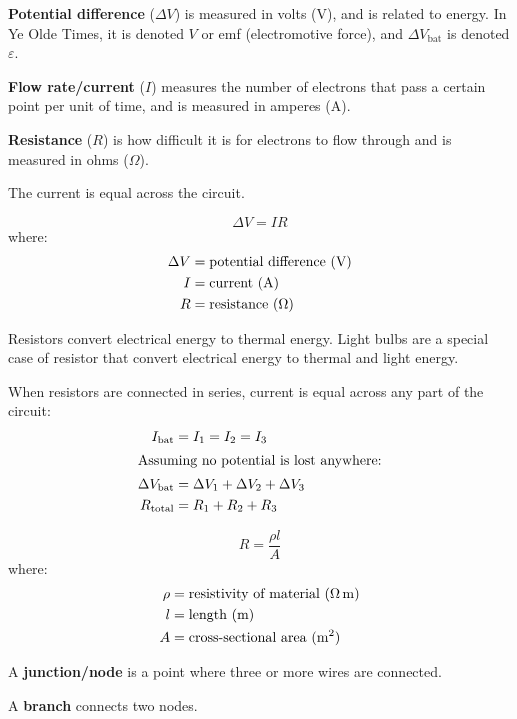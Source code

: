 \documentclass{article}
\newcommand{\definition}[1]{\begin{tcolorbox}[colback=red!5!white,colframe=red!75!black,parbox=false] #1 \end{tcolorbox}}
\newcommand{\theorem}[2]{\begin{tcolorbox}[title={#1},colback=blue!5!white,colframe=blue!75!black,parbox=false] #2 \end{tcolorbox}}
\begin{document}
\definition{
	\textbf{Potential difference} ($\Delta V$) is measured in volts (V), and is related to energy. In Ye Olde Times, it is denoted $V$ or emf (electromotive force), and $\Delta V_\text{bat}$ is denoted $\varepsilon$.

	\textbf{Flow rate/current} ($I$) measures the number of electrons that pass a certain point per unit of time, and is measured in amperes (A).

	\textbf{Resistance} ($R$) is how difficult it is for electrons to flow through and is measured in ohms ($\Omega$).
}

The current is equal across the circuit.

\theorem{Ohm's Law}{
	\begin{equation*}
	    \Delta V=IR
	\end{equation*}
	where:
	\begin{align*}
		\Delta V&=\text{potential difference (V)} \\
		I&=\text{current (A)} \\
		R&=\text{resistance (\si{\ohm})}
	\end{align*}
}

Resistors convert electrical energy to thermal energy. Light bulbs are a special case of resistor that convert electrical energy to thermal and light energy.

\theorem{Resistors in series}{
	When resistors are connected in series, current is equal across any part of the circuit:
	\begin{align*}
		I_\text{bat}&=I_1=I_2=I_3 \\
		\intertext{Assuming no potential is lost anywhere:}
		\Delta V_\text{bat}&=\Delta V_1+\Delta V_2+\Delta V_3 \\
		R_\text{total}&=R_1+R_2+R_3
	\end{align*}
}

\theorem{Resistance}{
	\begin{equation*}
	    R=\frac{\rho l}{A}
	\end{equation*}
	where:
	\begin{align*}
	    \rho&=\text{resistivity of material (\si{\ohm\meter})} \\
		l&=\text{length (m)} \\
		A&=\text{cross-sectional area (\si{m^2})}
	\end{align*}
}

\definition{A \textbf{junction/node} is a point where three or more wires are connected.

A \textbf{branch} connects two nodes.}
\end{document}
